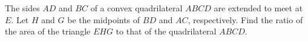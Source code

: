 The sides $AD$ and $BC$ of a convex quadrilateral $ABCD$ are extended to meet at $E$.  Let $H$ and $G$ be the midpoints of $BD$ and $AC$,  respectively.  Find the ratio of the area of the triangle $EHG$ to that of the quadrilateral $ABCD$.